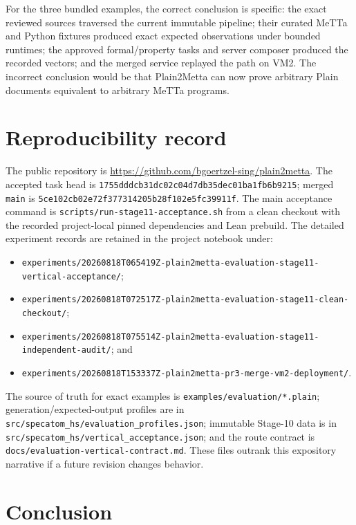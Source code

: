 \documentclass[11pt]{article}
\newcommand{\code}[1]{\texttt{#1}}
\begin{document}
For the three bundled examples, the correct conclusion is specific: the exact
reviewed sources traversed the current immutable pipeline; their curated
MeTTa and Python fixtures produced exact expected observations under bounded
runtimes; the approved formal/property tasks and server composer produced the
recorded vectors; and the merged service replayed the path on VM2.  The
incorrect conclusion would be that Plain2Metta can now prove arbitrary Plain
documents equivalent to arbitrary MeTTa programs.

\section{Reproducibility record}

The public repository is \url{https://github.com/bgoertzel-sing/plain2metta}.
The accepted task head is
\code{1755dddcb31dc02c04d7db35dec01ba1fb6b9215}; merged \code{main} is
\code{5ce102cb02e72f377314205b28f102e5fc39911f}.  The main acceptance command
is \code{scripts/run-stage11-acceptance.sh} from a clean checkout with the
recorded project-local pinned dependencies and Lean prebuild.  The detailed
experiment records are retained in the project notebook under:

\begin{itemize}
\item \code{experiments/20260818T065419Z-plain2metta-evaluation-stage11-vertical-acceptance/};
\item \code{experiments/20260818T072517Z-plain2metta-evaluation-stage11-clean-checkout/};
\item \code{experiments/20260818T075514Z-plain2metta-evaluation-stage11-independent-audit/}; and
\item \code{experiments/20260818T153337Z-plain2metta-pr3-merge-vm2-deployment/}.
\end{itemize}

The source of truth for exact examples is
\code{examples/evaluation/*.plain}; generation/expected-output profiles are in
\code{src/specatom\_hs/evaluation\_profiles.json}; immutable Stage-10 data is
in \code{src/specatom\_hs/vertical\_acceptance.json}; and the route contract
is \code{docs/evaluation-vertical-contract.md}.  These files outrank this
expository narrative if a future revision changes behavior.

\section{Conclusion}
\end{document}

